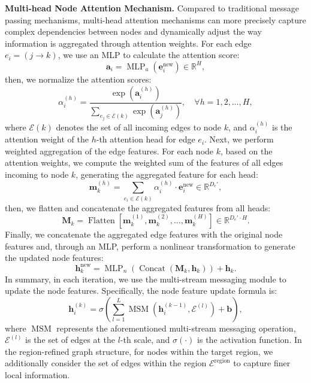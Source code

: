 \textbf{Multi-head Node Attention Mechanism.} Compared to traditional message passing mechanisms, multi-head attention mechanisms can more precisely capture complex dependencies between nodes and dynamically adjust the way information is aggregated through attention weights. For each edge $e_i = (j \rightarrow k)$, we use an MLP to calculate the attention score:
\begin{equation}
\mathbf{a}_i = \operatorname{MLP}_a\left( \mathbf{e}_i^{\text{new}} \right) \in \mathbb{R}^H,
\end{equation}
then, we normalize the attention scores:
\begin{equation}
\alpha_i^{(h)} = \frac{\exp\left( \mathbf{a}_i^{(h)} \right)}{ \sum_{e_j \in \mathcal{E}(k)} \exp\left( \mathbf{a}_j^{(h)} \right) }, \quad \forall h = 1, 2, \dots, H,
\end{equation}
where $\mathcal{E}(k)$ denotes the set of all incoming edges to node $k$, and $\alpha_i^{(h)}$ is the attention weight of the $h$-th attention head for edge $e_i$. Next, we perform weighted aggregation of the edge features. For each node $k$, based on the attention weights, we compute the weighted sum of the features of all edges incoming to node $k$, generating the aggregated feature for each head:
\begin{equation}
\mathbf{m}_k^{(h)} = \sum_{e_i \in \mathcal{E}(k)} \alpha_i^{(h)} \cdot \mathbf{e}_i^{\text{new}} \in \mathbb{R}^{D_e'},
\end{equation}
then, we flatten and concatenate the aggregated features from all heads:
\begin{equation}
\mathbf{M}_k = \operatorname{Flatten}\left[ \mathbf{m}_k^{(1)}, \mathbf{m}_k^{(2)}, \dots, \mathbf{m}_k^{(H)} \right] \in \mathbb{R}^{D_e' \cdot H}.
\end{equation}
Finally, we concatenate the aggregated edge features with the original node features and, through an MLP, perform a nonlinear transformation to generate the updated node features:
\begin{equation}
\mathbf{h}_k^{\text{new}} = \operatorname{MLP}_n\left( \operatorname{Concat}\left( \mathbf{M}_k, \mathbf{h}_k \right) \right) + \mathbf{h}_k.
\end{equation}
In summary, in each iteration, we use the multi-stream messaging module to update the node features. Specifically, the node feature update formula is:
\begin{equation}
\mathbf{h}_i^{(k)} = \sigma \left( \sum_{l=1}^{L} \operatorname{MSM}\left( \mathbf{h}_i^{(k-1)}, \mathcal{E}^{(l)} \right) + \mathbf{b} \right),
\end{equation}
where $\operatorname{MSM}$ represents the aforementioned multi-stream messaging operation, $\mathcal{E}^{(l)}$ is the set of edges at the $l$-th scale, and $\sigma(\cdot)$ is the activation function. In the region-refined graph structure, for nodes within the target region, we additionally consider the set of edges within the region $\mathcal{E}^{\text{region}}$ to capture finer local information.

